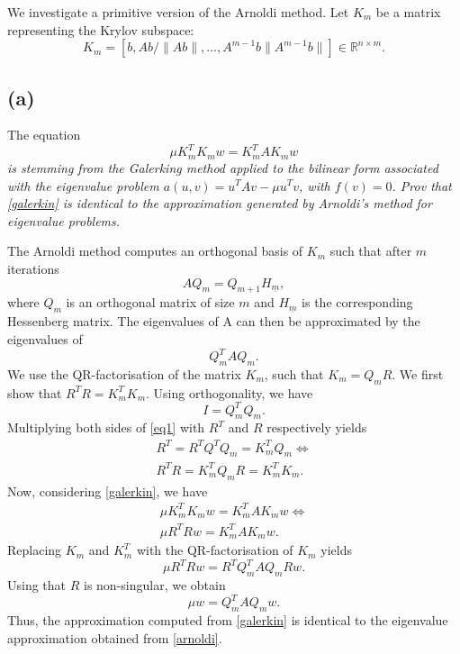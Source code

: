 
We investigate a primitive version of the Arnoldi method. Let $K_m$ be a matrix representing the Krylov subspace: 
\begin{equation}
K_m = [b, Ab/ \|Ab\|,\dots,A^{m-1}b \|A^{m-1}b\|]
\in\mathbb{R}^{n\times m}.
\end{equation}
\subsection{(a)}
The equation
\begin{equation}\label{galerkin}
\mu K_m^TK_mw = K_m^TAK_mw
\end{equation}
\emph{is stemming from the Galerking method applied to the bilinear form associated with the eigenvalue problem $a(u,v) = u^TAv-\mu u^Tv$, with $f(v) = 0$. Prov that \eqref{galerkin} is identical to the approximation generated by Arnoldi's method for eigenvalue problems.}

The Arnoldi method computes an orthogonal basis of $K_m$ such that after $m$ iterations
\begin{equation}
AQ_m = Q_{m+1}H_{\underline{m}}, 
\end{equation}
where $Q_m$ is an orthogonal matrix of size $m$ and $H_{\underline{m}}$ is the corresponding Hessenberg matrix. The eigenvalues of A can then be approximated by the eigenvalues of 
\begin{equation}\label{arnoldi}
Q_m^TAQ_m.
\end{equation}
We use the QR-factorisation of the matrix $K_m$, such that $K_m = Q_mR$. We first show that $R^TR = K_m^TK_m$. Using orthogonality, we have
\begin{equation}\label{eq1}
I = Q^T_mQ_m.
\end{equation}
Multiplying both sides of \eqref{eq1} with $R^T$ and $R$ respectively yields
\begin{equation}
\begin{aligned}
R^T = R^TQ^TQ_m = K^T_mQ_m\Leftrightarrow\\
R^TR  = K^T_mQ_mR = K_m^TK_m.
\end{aligned}
\end{equation}
Now, considering \eqref{galerkin}, we have
\begin{equation}
\begin{aligned}
\mu K_m^TK_mw = K_m^TAK_mw\Leftrightarrow\\
\mu R^TRw = K_m^TAK_mw.
\end{aligned}
\end{equation}
Replacing $K_m$ and $K_m^T$ with the QR-factorisation of $K_m$ yields
\begin{equation}
\mu R^TRw = R^TQ_m^TAQ_mRw.
\end{equation}
Using that $R$ is non-singular, we obtain
\begin{equation}
\mu w = Q_m^TAQ_mw.
\end{equation}
Thus, the approximation computed from \eqref{galerkin} is identical to the eigenvalue approximation obtained from \eqref{arnoldi}.

